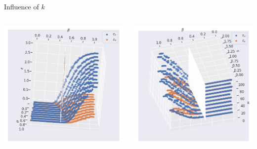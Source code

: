 \documentclass{beamer}
\begin{document}
\begin{frame}{Influence of $k$}
	\begin{minipage}[0.95\textheight]{\textwidth}
	\begin{columns}[T]
	\begin{column}{0.50\textwidth}
	\includegraphics[width=\textwidth, keepaspectratio]{images/N100_3d.png}
	\end{column}
	\begin{column}{0.50\textwidth}
	\includegraphics[width=\textwidth, keepaspectratio]{images/sigma1_3d.png}
	\end{column}
	\end{columns}
	\end{minipage}
\end{frame}
\end{document}
